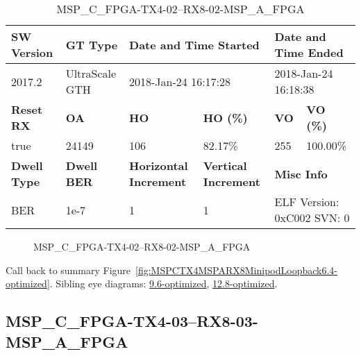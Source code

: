 \begin{table}[h]
\centering
\caption{MSP\_C\_FPGA-TX4-02--RX8-02-MSP\_A\_FPGA}
\label{tab:MSPCFPGATX402RX802MSPAFPGA6.4-optimized}
\begin{tabular}{@{}|l|l|l|l|l|l|@{}}
\toprule
\textbf{SW Version}                & \textbf{GT Type}   & \multicolumn{2}{l|}{\textbf{Date and Time Started}}            & \multicolumn{2}{l|}{\textbf{Date and Time Ended}}        \\ \midrule
2017.2                       & UltraScale GTH          & \multicolumn{2}{l|}{2018-Jan-24 16:17:28}                   & \multicolumn{2}{l|}{2018-Jan-24 16:18:38}               \\ \midrule
\textbf{Reset RX}                  & \textbf{OA} & \textbf{HO}   & \textbf{HO (\%)} & \textbf{VO} & \textbf{VO (\%)} \\ \midrule
true & 24149        & 106          & 82.17\%        & 255        & 100.00\%       \\ \midrule
\textbf{Dwell Type}                & \textbf{Dwell BER} & \textbf{Horizontal Increment} & \textbf{Vertical Increment}    & \multicolumn{2}{l|}{\textbf{Misc Info}}                  \\ \midrule
BER                            & 1e-7        & 1        & 1           & \multicolumn{2}{l|}{ELF Version: 0xC002 SVN: 0}                         \\ \bottomrule
\end{tabular}
\end{table}

\begin{figure}[h]
\caption{MSP\_C\_FPGA-TX4-02--RX8-02-MSP\_A\_FPGA} \label{fig:MSPCFPGATX402RX802MSPAFPGA6.4-optimized}
\end{figure}

Call back to summary Figure~\ref{fig:MSPCTX4MSPARX8MinipodLoopback6.4-optimized}.
Sibling eye diagrams: \hyperref[sec:MSPCFPGATX402RX802MSPAFPGA9.6-optimized]{9.6-optimized}, \hyperref[sec:MSPCFPGATX402RX802MSPAFPGA12.8-optimized]{12.8-optimized}.

\clearpage
\newpage


\subsection{MSP\_C\_FPGA-TX4-03--RX8-03-MSP\_A\_FPGA}\label{sec:MSPCFPGATX403RX803MSPAFPGA6.4-optimized}

